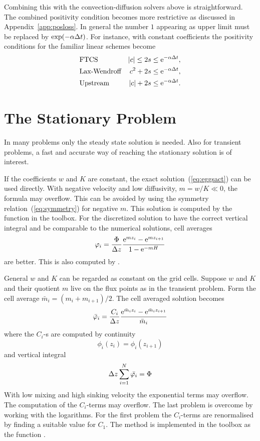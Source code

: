 Combining this with the convection-diffusion solvers above is
straightforward. The combined positivity condition becomes more
restrictive as discussed in Appendix~\ref{app:posloss}. 
In general the number $1$ appearing as upper limit must be replaced
by $\exp(-\alpha \Delta t)$.  For instance, with constant coefficients
the positivity conditions for the familiar linear schemes become
\begin{align}
  & \text{FTCS}         & |c| \le 2 s & \le \mathrm{e}^{-\alpha \Delta t} , \\
  & \text{Lax-Wendroff} & c^2 + 2 s       & \le \mathrm{e}^{-\alpha \Delta t} , \\
  & \text{Upstream}     &  |c| + 2 s  & \le \mathrm{e}^{-\alpha \Delta t} .
\end{align}


  
\section{The Stationary Problem}\label{sec:statprob}

In many problems only the steady state solution is needed.  Also for
transient problems, a fast and accurate way of reaching the stationary
solution is of interest.

If the coefficients $w$ and $K$ are constant, the exact
solution~(\ref{eq:eggsact}) can be used directly. With negative
velocity and low diffusivity, $m = w/K \ll 0$, the formula may overflow.  This
can be avoided by using the symmetry relation~(\ref{eq:symmetry}) for
negative $m$.  This solution is computed by the function 
in the toolbox. For the discretized solution to have the correct
vertical integral and be comparable to the numerical solutions, cell
averages
\begin{equation}
  \varphi_i = \frac{\Phi}{\Delta z}
           \frac{\mathrm{e}^{m z_i} - \mathrm{e}^{m z_{i+1}}}{1 - \mathrm{e}^{-mH}} 
\end{equation}
are better. This is also computed by .


General $w$ and $K$ can be regarded as constant on the grid cells.
Suppose $w$ and $K$ and their quotient $m$ live on the flux points as
in the transient problem. Form the cell average $\bar{m}_i = (m_i +
m_{i+1}) / 2$. The cell averaged solution becomes
\begin{equation}
  \bar{\varphi}_i = 
     \frac{C_i}{\Delta z} 
     \frac{\mathrm{e}^{\bar{m}_i z_i} - \mathrm{e}^{\bar{m}_i z_{i+1}}}{\bar{m}_i}
\end{equation}
where the $C_i$-s are computed by continuity
\begin{equation}
  \phi_i(z_i) = \phi_i(z_{i+1})
\end{equation}
and vertical integral
\begin{equation}
  \Delta z \sum_{i = 1}^N \bar{\varphi_i} = \Phi
\end{equation}
With low mixing and high sinking velocity the exponential terms may
overflow. The computation of the $C_i$-terms may overflow.  The last
problem is overcome by working with the logarithms. For the first
problem the $C_i$-terms are renormalised by finding a suitable value for
$C_1$. The method is implemented in the toolbox as the function
.



